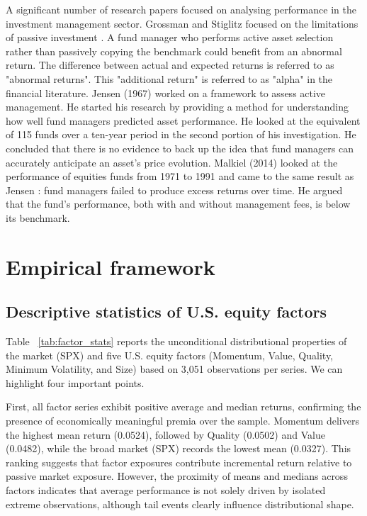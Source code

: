 \documentclass{article}
\begin{document}
A significant number of research papers focused on analysing performance in the investment management sector. Grossman and Stiglitz focused on the limitations of passive investment \cite{grossman1980}. A fund manager who performs active asset selection rather than passively copying the benchmark could benefit from an abnormal return. The difference between actual and expected returns is referred to as "abnormal returns". This "additional return" is referred to as "alpha" in the financial literature. Jensen (1967) \cite{jensen1967} worked on a framework to assess active management. He started his research by providing a method for understanding how well fund managers predicted asset performance. He looked at the equivalent of 115 funds over a ten-year period in the second portion of his investigation. He concluded that there is no evidence to back up the idea that fund managers can accurately anticipate an asset's price evolution. Malkiel (2014) \cite{malkiel2014} looked at the performance of equities funds from 1971 to 1991 and came to the same result as Jensen \cite{jensen1967}: fund managers failed to produce excess returns over time. He argued that the fund's performance, both with and without management fees, is below its benchmark.\newline

\section{Empirical framework}

\subsection{Descriptive statistics of U.S. equity factors}

Table ~\ref{tab:factor_stats} reports the unconditional distributional properties of the market (SPX) and five  U.S. equity factors (Momentum, Value, Quality, Minimum Volatility, and Size) based on 3,051 observations per series. We can highlight four important points.\newline

First, all factor series exhibit positive average and median returns, confirming the presence of economically meaningful premia over the sample. Momentum delivers the highest mean return (0.0524), followed by Quality (0.0502) and Value (0.0482), while the broad market (SPX) records the lowest mean (0.0327). This ranking suggests that factor exposures contribute incremental return relative to passive market exposure. However, the proximity of means and medians across factors indicates that average performance is not solely driven by isolated extreme observations, although tail events clearly influence distributional shape.\newline
\end{document}
